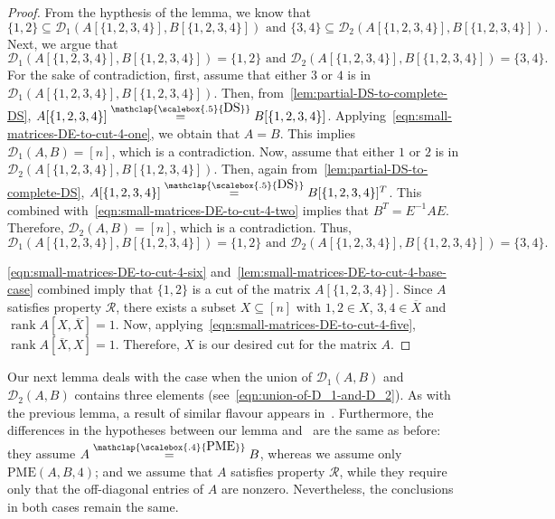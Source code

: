 \documentclass[11pt,letterpaper]{article}
\DeclareMathOperator*{\rank}{rank}
\newcommand{\comp}[1]{\overline{#1}}
\newcommand{\DS}{\stackrel{\mathclap{\scalebox{.5}{\mbox{DS}}}}{=}}
\newcommand{\PME}{\stackrel{\mathclap{\scalebox{.4}{\mbox{PME}}}}{=}}
\newcommand{\kPME}[3]{\mathrm{PME}(#1, #2, #3)}
\newcommand{\calD}{\mathcal{D}}
\newcommand{\prop}{\mathcal{R}}
\begin{document}
{{{\begin{proof}
From the hypthesis of the lemma, we know that $$\{1,2\}\subseteq \calD_1\left(A[\{1,2,3,4\}], B[\{1,2,3,4\}]\right) \text{ and } \{3,4\}\subseteq\calD_2\left(A[\{1,2,3,4\}], B[\{1,2,3,4\}]\right).$$ Next, we argue that $$\calD_1\left(A[\{1,2,3,4\}], B[\{1,2,3,4\}]\right)=\{1,2\} \text{ and } \calD_2\left(A[\{1,2,3,4\}], B[\{1,2,3,4\}]\right)=\{3,4\}.$$ For the sake of contradiction, first, assume that either $3$ or $4$ is in $\calD_1\left(A[\{1,2,3,4\}], B[\{1,2,3,4\}]\right)$. Then, from~\cref{lem:partial-DS-to-complete-DS}, $A[\{1,2,3,4\}]\DS  B[\{1,2,3,4\}]$. Applying~\cref{eqn:small-matrices-DE-to-cut-4-one}, we obtain that $A=B$. This implies $\calD_1(A,B)=[n]$, which is a contradiction. Now, assume that either $1$ or $2$ is in $\calD_2\left(A[\{1,2,3,4\}], B[\{1,2,3,4\}]\right)$. Then, again from~\cref{lem:partial-DS-to-complete-DS}, $A[\{1,2,3,4\}]\DS  B[\{1,2,3,4\}]^T$. This combined with~\cref{eqn:small-matrices-DE-to-cut-4-two} implies that $B^T=E^{-1}AE$. Therefore, $\calD_2(A,B)=[n]$, which is a contradiction. Thus, 
\begin{equation}
\label{eqn:small-matrices-DE-to-cut-4-six}
\calD_1\left(A[\{1,2,3,4\}], B[\{1,2,3,4\}]\right)=\{1,2\} \text{ and } \calD_2\left(A[\{1,2,3,4\}], B[\{1,2,3,4\}]\right)=\{3,4\}.
\end{equation}


\cref{eqn:small-matrices-DE-to-cut-4-six} and~\cref{lem:small-matrices-DE-to-cut-4-base-case} combined imply that $\{1,2\}$ is a cut of the matrix $A[\{1,2,3,4\}]$. Since $A$ satisfies property $\prop$, there exists a subset $X\subseteq [n]$ with $1,2\in X$, $3,4 \in\comp{X}$ and $\rank A[X, \comp{X}]=1$. Now, applying~\cref{eqn:small-matrices-DE-to-cut-4-five}, $\rank A[\comp{X}, X]=1$. Therefore, $X$ is our desired cut for the matrix $A$.
\end{proof}


Our next lemma deals with the case when the union of $\calD_1(A, B)$ and $\calD_2(A, B)$ contains three elements (see~\cref{eqn:union-of-D_1-and-D_2}). As with the previous lemma, a result of similar flavour appears in~\cite[Theorem~4]{Loewy86}. Furthermore, the differences in the hypotheses between our lemma and~\cite[Theorem~4]{Loewy86} are the same as before: they assume $A \PME B$, whereas we assume only $\kPME{A}{B}{4}$; and we assume that $A$ satisfies property $\prop$, while they require only that the off-diagonal entries of $A$ are nonzero. Nevertheless, the conclusions in both cases remain the same.

}}}
\end{document}
